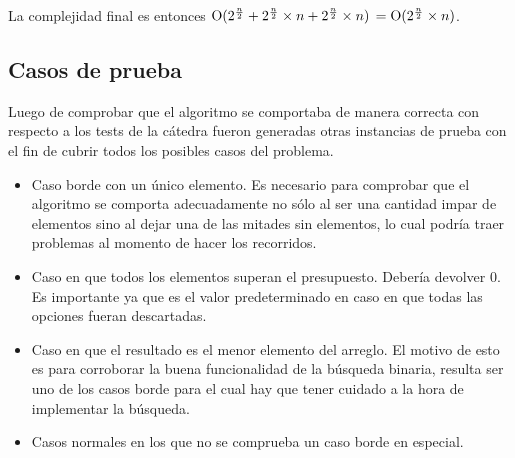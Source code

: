 La complejidad final es entonces
$\operatorname{O}(2^{\frac{n}{2}} + 2^{\frac{n}{2}} \times n + 2^{\frac{n}{2}} \times n)$
$ = \operatorname{O}(2^{\frac{n}{2}} \times n)$.

\subsection{Casos de prueba}

Luego de comprobar que el algoritmo se comportaba de manera correcta con
respecto a los tests de la cátedra fueron generadas otras instancias de prueba
con el fin de cubrir todos los posibles casos del problema.

\begin{itemize}
\item Caso borde con un único elemento. Es necesario para comprobar que el
algoritmo se comporta adecuadamente no sólo al ser una cantidad impar de
elementos sino al dejar una de las mitades sin elementos, lo cual podría traer
problemas al momento de hacer los recorridos.
\item Caso en que todos los elementos superan el presupuesto. Debería devolver
0. Es importante ya que es el valor predeterminado en caso en que todas las
opciones fueran descartadas.
\item Caso en que el resultado es el menor elemento del arreglo. El motivo de
esto es para corroborar la buena funcionalidad de la búsqueda binaria, resulta
ser uno de los casos borde para el cual hay que tener cuidado a la hora de
implementar la búsqueda.
\item Casos normales en los que no se comprueba un caso borde en especial.
\end{itemize}
